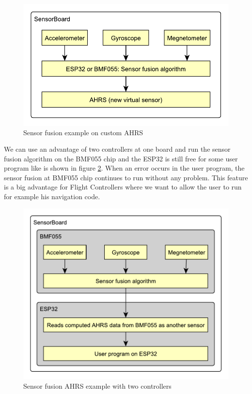 \begin{figure}[H]
	\centering
	\label{UEAHRS}
	\caption{Sensor fusion example on custom AHRS}
	\includegraphics[scale=1]{img/UsageExamplesAHRS.pdf}
\end{figure}

We can use an advantage of two controllers at one board and run the sensor fusion algorithm on the BMF055 chip and the ESP32 is still free for some user program like is shown in figure \ref{UEAHRSBMF}. When an error occurs in the user program, the sensor fusion at BMF055 chip continues to run without any problem. This feature is a big advantage for Flight Controllers where we want to allow the user to run for example his navigation code.

\begin{figure}[H]
	\centering
	\label{UEAHRSBMF}
	\caption{Sensor fusion AHRS example with two controllers}
	\includegraphics[scale=1]{img/UsageExamplesAHRSBMF.pdf}
\end{figure}

